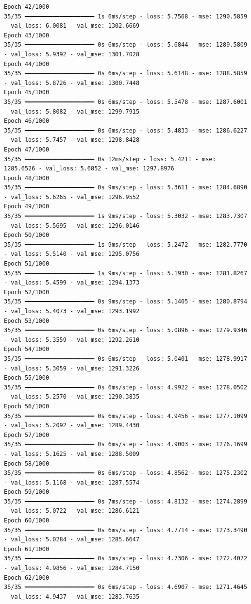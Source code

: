 \documentclass[
  letterpaper,
  DIV=11,
  numbers=noendperiod]{scrreprt}
\begin{document}
\begin{verbatim}
Epoch 42/1000
35/35 ━━━━━━━━━━━━━━━━━━━━ 1s 6ms/step - loss: 5.7568 - mse: 1290.5859 - val_loss: 6.0081 - val_mse: 1302.6669
Epoch 43/1000
35/35 ━━━━━━━━━━━━━━━━━━━━ 0s 6ms/step - loss: 5.6844 - mse: 1289.5809 - val_loss: 5.9392 - val_mse: 1301.7028
Epoch 44/1000
35/35 ━━━━━━━━━━━━━━━━━━━━ 0s 6ms/step - loss: 5.6148 - mse: 1288.5859 - val_loss: 5.8726 - val_mse: 1300.7448
Epoch 45/1000
35/35 ━━━━━━━━━━━━━━━━━━━━ 0s 6ms/step - loss: 5.5478 - mse: 1287.6001 - val_loss: 5.8082 - val_mse: 1299.7915
Epoch 46/1000
35/35 ━━━━━━━━━━━━━━━━━━━━ 0s 6ms/step - loss: 5.4833 - mse: 1286.6227 - val_loss: 5.7457 - val_mse: 1298.8428
Epoch 47/1000
35/35 ━━━━━━━━━━━━━━━━━━━━ 0s 12ms/step - loss: 5.4211 - mse: 1285.6526 - val_loss: 5.6852 - val_mse: 1297.8976
Epoch 48/1000
35/35 ━━━━━━━━━━━━━━━━━━━━ 0s 9ms/step - loss: 5.3611 - mse: 1284.6890 - val_loss: 5.6265 - val_mse: 1296.9552
Epoch 49/1000
35/35 ━━━━━━━━━━━━━━━━━━━━ 1s 9ms/step - loss: 5.3032 - mse: 1283.7307 - val_loss: 5.5695 - val_mse: 1296.0146
Epoch 50/1000
35/35 ━━━━━━━━━━━━━━━━━━━━ 1s 9ms/step - loss: 5.2472 - mse: 1282.7770 - val_loss: 5.5140 - val_mse: 1295.0756
Epoch 51/1000
35/35 ━━━━━━━━━━━━━━━━━━━━ 1s 9ms/step - loss: 5.1930 - mse: 1281.8267 - val_loss: 5.4599 - val_mse: 1294.1373
Epoch 52/1000
35/35 ━━━━━━━━━━━━━━━━━━━━ 0s 9ms/step - loss: 5.1405 - mse: 1280.8794 - val_loss: 5.4073 - val_mse: 1293.1992
Epoch 53/1000
35/35 ━━━━━━━━━━━━━━━━━━━━ 0s 6ms/step - loss: 5.0896 - mse: 1279.9346 - val_loss: 5.3559 - val_mse: 1292.2610
Epoch 54/1000
35/35 ━━━━━━━━━━━━━━━━━━━━ 0s 6ms/step - loss: 5.0401 - mse: 1278.9917 - val_loss: 5.3059 - val_mse: 1291.3226
Epoch 55/1000
35/35 ━━━━━━━━━━━━━━━━━━━━ 0s 6ms/step - loss: 4.9922 - mse: 1278.0502 - val_loss: 5.2570 - val_mse: 1290.3835
Epoch 56/1000
35/35 ━━━━━━━━━━━━━━━━━━━━ 0s 6ms/step - loss: 4.9456 - mse: 1277.1099 - val_loss: 5.2092 - val_mse: 1289.4430
Epoch 57/1000
35/35 ━━━━━━━━━━━━━━━━━━━━ 0s 6ms/step - loss: 4.9003 - mse: 1276.1699 - val_loss: 5.1625 - val_mse: 1288.5009
Epoch 58/1000
35/35 ━━━━━━━━━━━━━━━━━━━━ 0s 6ms/step - loss: 4.8562 - mse: 1275.2302 - val_loss: 5.1168 - val_mse: 1287.5574
Epoch 59/1000
35/35 ━━━━━━━━━━━━━━━━━━━━ 0s 7ms/step - loss: 4.8132 - mse: 1274.2899 - val_loss: 5.0722 - val_mse: 1286.6121
Epoch 60/1000
35/35 ━━━━━━━━━━━━━━━━━━━━ 0s 6ms/step - loss: 4.7714 - mse: 1273.3490 - val_loss: 5.0284 - val_mse: 1285.6647
Epoch 61/1000
35/35 ━━━━━━━━━━━━━━━━━━━━ 0s 5ms/step - loss: 4.7306 - mse: 1272.4072 - val_loss: 4.9856 - val_mse: 1284.7150
Epoch 62/1000
35/35 ━━━━━━━━━━━━━━━━━━━━ 0s 6ms/step - loss: 4.6907 - mse: 1271.4645 - val_loss: 4.9437 - val_mse: 1283.7635

\end{verbatim}
\end{document}
